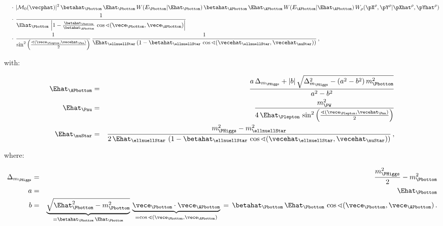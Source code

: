 \begin{linenowrapper}
\begin{align}
 & \quad \cdot \, \vert \mathcal{M}_{0}(\vecphat) \vert^{2} \, 
\betahat_{\Pbottom} \, \Ehat_{\Pbottom} \, W(E_{\Pbottom}|\Ehat_{\Pbottom}) \, 
\betahat_{\APbottom} \, \Ehat_{\APbottom} \, W(E_{\APbottom}|\Ehat_{\APbottom}) \,
W_{\rho}( \pX^{\rho},\pY^{\rho} | \pXhat^{\rho},\pYhat^{\rho} ) \nonumber \\
 & \quad \cdot \, \frac{1}{\Ehat_{\Pbottom} \, \left\lvert 1 - \frac{\betahat_{\Pbottom}}{\betahat_{\APbottom}} \, \cos\sphericalangle(\vece_{\Pbottom},\vece_{\APbottom}) \right\rvert} \nonumber \\
 & \quad \cdot \, \frac{1}{\sin^{2}\left(\frac{\sphericalangle(\vece_{\Plepton},\vecehat_{\Pnu})}{2}\right)} \,
\frac{1}{\Ehat_{\ellnuellStar} \left( 1 - \betahat_{\ellnuellStar} \, \cos\sphericalangle(\vecehat_{\ellnuellStar},\vecehat_{\nuStar}) \right)} \, ,
\label{eq:mem_signal}
\end{align}
\end{linenowrapper}
with:
\begin{linenowrapper}
\begin{eqnarray}
\Ehat_{\APbottom} & = & \frac{a \, \Delta_{m_{\PHiggs}} + |b| \, \sqrt{\Delta_{m_{\PHiggs}}^{2} - (a^{2} - b^{2}) \, m_{\Pbottom}^{2}}}{a^{2} - b^{2}} \nonumber \\
\Ehat_{\Pnu} & = & \frac{m_{\PW}^{2}}{4 \, \Ehat_{\Plepton} \, \sin^{2}\left(\frac{\sphericalangle(\vece_{\Plepton},\vecehat_{\Pnu})}{2}\right)} \nonumber \\
\Ehat_{\nuStar} & = & \frac{m_{\PHiggs}^{2} - m_{\ellnuellStar}^{2}}{2 \, \Ehat_{\ellnuellStar} \, 
 \left( 1 - \betahat_{\ellnuellStar} \, \cos\sphericalangle(\vecehat_{\ellnuellStar},\vecehat_{\nuStar}) \right)} \, ,
\end{eqnarray}
\end{linenowrapper}
where:
\begin{linenowrapper}
\begin{eqnarray}
\Delta_{m_{\PHiggs}} & = & \frac{m_{\PHiggs}^{2}}{2} - m_{\Pbottom}^{2} \nonumber \\
a & = & \Ehat_{\Pbottom} \nonumber \\
b & = & \underbrace{\sqrt{\Ehat_{\Pbottom}^{2} - m_{\Pbottom}^{2}}}_{= \betahat_{\Pbottom} \, \Ehat_{\Pbottom}} \, 
 \underbrace{\vece_{\Pbottom} \cdot \vece_{\APbottom}}_{= \cos\sphericalangle(\vece_{\Pbottom},\vece_{\APbottom})} \, 
= \, \betahat_{\Pbottom} \, \Ehat_{\Pbottom} \, \cos\sphericalangle(\vece_{\Pbottom},\vece_{\APbottom}) \, .
\end{eqnarray}
\end{linenowrapper}
